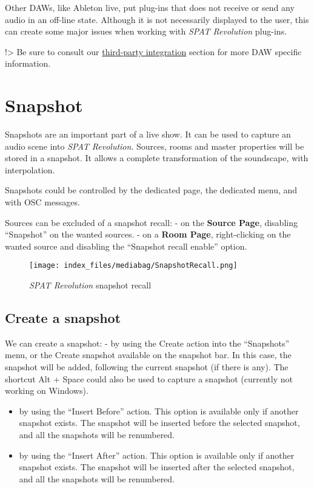 \documentclass[
  letterpaper,
  DIV=11,
  numbers=noendperiod]{scrreport}
\begin{document}
Other DAWs, like Ableton live, put plug-ins that does not receive or
send any audio in an off-line state. Although it is not necessarily
displayed to the user, this can create some major issues when working
with \emph{SPAT Revolution} plug-ins.

!\textgreater{} Be sure to consult our
\href{Third_Party_Integration.md}{third-party integration} section for
more DAW specific information.

\hypertarget{snapshot}{%
\chapter{Snapshot}\label{snapshot}}

Snapshots are an important part of a live show. It can be used to
capture an audio scene into \emph{SPAT Revolution}. Sources, rooms and
master properties will be stored in a snapshot. It allows a complete
transformation of the soundscape, with interpolation.

Snapshots could be controlled by the dedicated page, the dedicated menu,
and with OSC messages.

Sources can be excluded of a snapshot recall: - on the \textbf{Source
Page}, disabling ``Snapshot'' on the wanted sources. - on a \textbf{Room
Page}, right-clicking on the wanted source and disabling the ``Snapshot
recall enable'' option.

\begin{figure}

{\centering \texttt{[image: index\_files/mediabag/SnapshotRecall.png]}

}

\caption{\emph{SPAT Revolution} snapshot recall}

\end{figure}

\hypertarget{create-a-snapshot}{%
\section{Create a snapshot}\label{create-a-snapshot}}

We can create a snapshot: - by using the Create action into the
``Snapshots'' menu, or the Create snapshot available on the snapshot
bar. In this case, the snapshot will be added, following the current
snapshot (if there is any). The shortcut Alt + Space could also be used
to capture a snapshot (currently not working on Windows).

\begin{itemize}
\item
  by using the ``Insert Before'' action. This option is available only
  if another snapshot exists. The snapshot will be inserted before the
  selected snapshot, and all the snapshots will be renumbered.
\item
  by using the ``Insert After'' action. This option is available only if
  another snapshot exists. The snapshot will be inserted after the
  selected snapshot, and all the snapshots will be renumbered.
\end{itemize}
\end{document}
